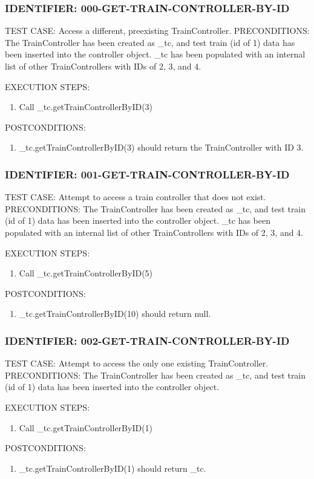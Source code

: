 \documentclass{scrreprt}
\begin{document}
\subsubsection{IDENTIFIER: 000-GET-TRAIN-CONTROLLER-BY-ID}
TEST CASE: Access a different, preexisting TrainController.
PRECONDITIONS: The TrainController has been created as _tc, and test train (id of 1) data has been inserted into the controller object. _tc has been populated with an internal list of other TrainControllers with IDs of 2, 3, and 4.

EXECUTION STEPS:
\begin{enumerate}
	\item Call _tc.getTrainControllerByID(3)
\end{enumerate}
POSTCONDITIONS:
\begin{enumerate}
	\item _tc.getTrainControllerByID(3) should return the TrainController with ID 3.
\end{enumerate}

\subsubsection{IDENTIFIER: 001-GET-TRAIN-CONTROLLER-BY-ID}
TEST CASE: Attempt to access a train controller that does not exist.
PRECONDITIONS: The TrainController has been created as _tc, and test train (id of 1) data has been inserted into the controller object. _tc has been populated with an internal list of other TrainControllers with IDs of 2, 3, and 4.

EXECUTION STEPS:
\begin{enumerate}
	\item Call _tc.getTrainControllerByID(5)
\end{enumerate}
POSTCONDITIONS:
\begin{enumerate}
	\item _tc.getTrainControllerByID(10) should return null.
\end{enumerate}

\subsubsection{IDENTIFIER: 002-GET-TRAIN-CONTROLLER-BY-ID}
TEST CASE: Attempt to access the only one existing TrainController.
PRECONDITIONS: The TrainController has been created as _tc, and test train (id of 1) data has been inserted into the controller object.

EXECUTION STEPS:
\begin{enumerate}
	\item Call _tc.getTrainControllerByID(1)
\end{enumerate}
POSTCONDITIONS:
\begin{enumerate}
	\item _tc.getTrainControllerByID(1) should return _tc.
\end{enumerate}
\end{document}
